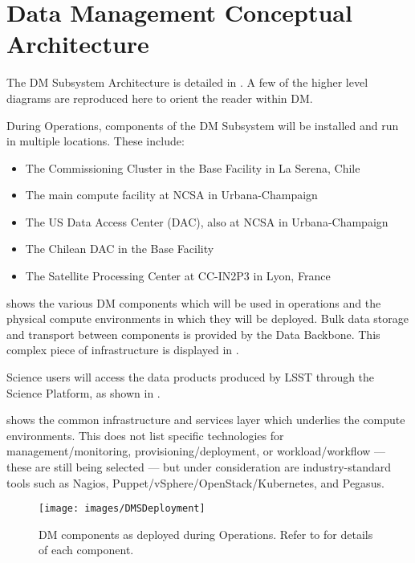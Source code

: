 \section{Data Management Conceptual Architecture \label{sect:dmarc}}

The DM Subsystem Architecture is detailed in .
A few of the higher level diagrams are reproduced here to orient the reader within DM.

During Operations, components of the DM Subsystem will be installed and run in
multiple locations. These include:

\begin{itemize}
\item The Commissioning Cluster in the Base Facility in La Serena, Chile
\item The main compute facility at NCSA in Urbana-Champaign
\item The US Data Access Center (DAC), also at NCSA in Urbana-Champaign
\item The Chilean DAC in the Base Facility
\item The Satellite Processing Center at CC-IN2P3 in Lyon, France
\end{itemize}

 shows the various DM components which will be used in operations and the physical compute environments in which they will be deployed.
Bulk data storage and transport between components is provided by the Data Backbone. This complex piece of infrastructure is displayed in .

Science users will access the data products produced by LSST through the
Science Platform, as shown in .

 shows the common infrastructure and services layer which underlies the compute environments.
This does not list specific technologies for management/monitoring, provisioning/deployment, or workload/workflow --- these are still being selected --- but under consideration are industry-standard tools such as Nagios, Puppet/vSphere/OpenStack/Kubernetes, and Pegasus.

\begin{figure}[htbp]
\begin{center}
\texttt{[image: images/DMSDeployment]}
\caption{DM components as deployed during Operations. Refer to  for details of each component.}
\label{fig:dmsdeploy}
\end{center}
\end{figure}

